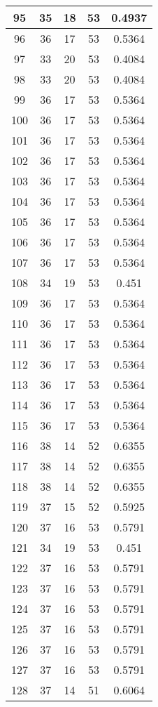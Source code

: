 \documentclass[letterpaper, 12pt]{article}
\begin{document}
\begin{longtable}{|c|c|c|c|c|}
\hline
95 & 35 & 18 & 53 & 0.4937 \\
\hline
96 & 36 & 17 & 53 & 0.5364 \\
\hline
97 & 33 & 20 & 53 & 0.4084 \\
\hline
98 & 33 & 20 & 53 & 0.4084 \\
\hline
99 & 36 & 17 & 53 & 0.5364 \\
\hline
100 & 36 & 17 & 53 & 0.5364 \\
\hline
101 & 36 & 17 & 53 & 0.5364 \\
\hline
102 & 36 & 17 & 53 & 0.5364 \\
\hline
103 & 36 & 17 & 53 & 0.5364 \\
\hline
104 & 36 & 17 & 53 & 0.5364 \\
\hline
105 & 36 & 17 & 53 & 0.5364 \\
\hline
106 & 36 & 17 & 53 & 0.5364 \\
\hline
107 & 36 & 17 & 53 & 0.5364 \\
\hline
108 & 34 & 19 & 53 & 0.451 \\
\hline
109 & 36 & 17 & 53 & 0.5364 \\
\hline
110 & 36 & 17 & 53 & 0.5364 \\
\hline
111 & 36 & 17 & 53 & 0.5364 \\
\hline
112 & 36 & 17 & 53 & 0.5364 \\
\hline
113 & 36 & 17 & 53 & 0.5364 \\
\hline
114 & 36 & 17 & 53 & 0.5364 \\
\hline
115 & 36 & 17 & 53 & 0.5364 \\
\hline
116 & 38 & 14 & 52 & 0.6355 \\
\hline
117 & 38 & 14 & 52 & 0.6355 \\
\hline
118 & 38 & 14 & 52 & 0.6355 \\
\hline
119 & 37 & 15 & 52 & 0.5925 \\
\hline
120 & 37 & 16 & 53 & 0.5791 \\
\hline
121 & 34 & 19 & 53 & 0.451 \\
\hline
122 & 37 & 16 & 53 & 0.5791 \\
\hline
123 & 37 & 16 & 53 & 0.5791 \\
\hline
124 & 37 & 16 & 53 & 0.5791 \\
\hline
125 & 37 & 16 & 53 & 0.5791 \\
\hline
126 & 37 & 16 & 53 & 0.5791 \\
\hline
127 & 37 & 16 & 53 & 0.5791 \\
\hline
128 & 37 & 14 & 51 & 0.6064 \\

\end{longtable}
\end{document}
